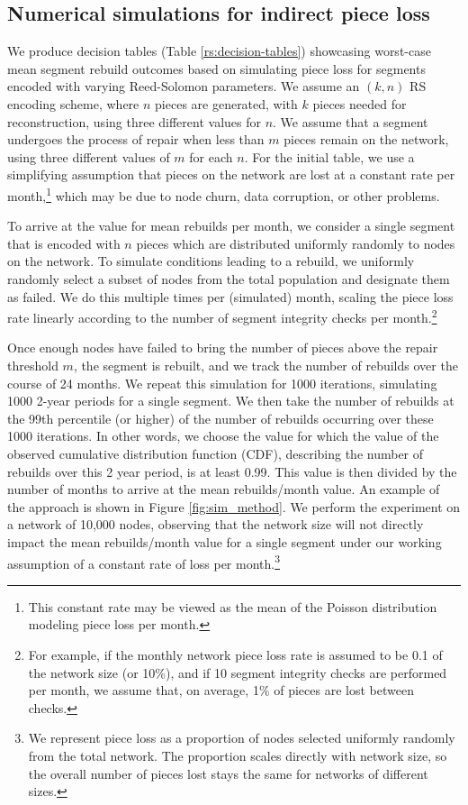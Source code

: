 
\subsection{Numerical simulations for indirect piece loss}\label{sec:RS-sim}

We produce decision tables (Table \ref{rs:decision-tables}) showcasing
worst-case mean segment rebuild outcomes based on simulating piece loss for segments encoded with varying Reed-Solomon parameters.
We assume an $(k,n)$ RS encoding scheme, where $n$ pieces are generated, with
$k$ pieces needed for reconstruction, using three different values for $n$.
We assume that a segment undergoes the process of repair when less than $m$ pieces remain on the network, using three different values of $m$ for each $n$.
For the initial table, we use a simplifying assumption that pieces on the network are lost at a constant rate per month,\footnote{This constant rate may be viewed as the mean of the Poisson distribution modeling piece loss per month.} which may be due to node churn, data corruption, or other problems.

To arrive at the value for mean rebuilds per month, we consider a single segment that is encoded with $n$ pieces which are distributed uniformly randomly to nodes on the network. To simulate conditions leading to a rebuild, we uniformly randomly select a subset of nodes from the total population and designate them as failed. We do this multiple times per (simulated) month, scaling the piece loss rate linearly according to the number of segment integrity checks per month.\footnote{
For example, if the monthly network piece loss rate is assumed to be 0.1 of the network size (or 10\%), and if 10 segment integrity checks are performed per month, we assume that, on average, 1\% of pieces are lost between checks.}

Once enough nodes have failed to bring the number of pieces above the repair threshold $m$, the segment is rebuilt, and we track the number of rebuilds over the course of 24 months.
We repeat this simulation for 1000 iterations, simulating 1000 2-year periods for a single segment. We then take the number of rebuilds at the 99th percentile (or higher) of the number of rebuilds occurring over these 1000 iterations. In other words, we choose the value for which the value of the observed cumulative distribution function (CDF), describing the number of rebuilds over this 2 year period, is at least 0.99. This value is then divided by the number of months to arrive at the mean rebuilds/month value. An example of the approach is shown in Figure \ref{fig:sim_method}. We perform the experiment on a network of 10,000 nodes, observing that the network size will not directly impact the mean rebuilds/month value for a single segment under our working assumption of a constant rate of loss per month.\footnote{We represent piece loss as a proportion of nodes selected uniformly randomly from the total network. The proportion scales directly with network size, so the overall number of pieces lost stays the same for networks of different sizes.}

